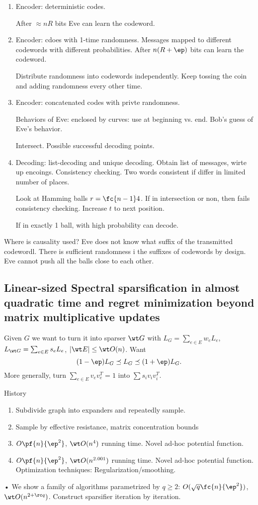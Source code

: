 \begin{enumerate}
\item
Encoder: deterministic codes.

After $\approx nR$ bits Eve can learn the codeword.
\item
Encoder: cdoes with 1-time randomness. Messages mapped to different codewords with different probabilities. After $n(R+\ep)$ bits can learn the codeword. 

Distribute randomness into codewords independently. Keep tossing the coin and adding randomness every other time.
\item
Encoder: concatenated codes with privte randomness. 

Behaviors of Eve: enclosed by curves: use at beginning vs. end. Bob's guess of Eve's behavior.

Intersect. Possible successful decoding points.
\item
Decoding: list-decoding and unique decoding. Obtain list of messages, wirte up encoings. Consistency checking. Two words consistent if differ in limited number of places.

Look at Hamming balls $r=\fc{n-1}4$. If in intersection or non, then fails consistency checking. Increase $t$ to next position.

If in exactly 1 ball, with high probability can decode. %
\end{enumerate}
Where is causality used? Eve does not know what suffix of the transmitted codewordl. There is sufficient randomness i the suffixes of codewords by design. Eve cannot push all the balls close to each other.

\subsection{Linear-sized Spectral sparsification in almost quadratic time and regret minimization beyond matrix multiplicative updates}

Given $G$ we want to turn it into sparser $\wt G$ with $L_G=\sum_{e\in E}w_eL_e$, $L_{\wt G}=\sum_{e\in E} s_eL_e$, $|\wt E|\le \wt O(n)$. Want 
\[
(1-\ep)L_G\preceq L_G\preceq (1+\ep)L_G.
\]
More generally, turn $\sum_{e\in E}v_ev_e^T=1$ into $\sum s_i v_iv_i^T$.

History
\begin{enumerate}
\item
Subdivide graph into expanders and repeatedly sample. 
\item
Sample by effective resistance, matrix concentration bounds
\item
$O\pf{n}{\ep^2}$, $\wt O(n^4)$ running time. Novel ad-hoc potential function.
\item
$O\pf{n}{\ep^2}$, $\wt O(n^{2.001})$ running time. Novel ad-hoc potential function.
Optimization techniques: Regularization/smoothing.
\end{enumerate}•
We show a family of algorithms parametrized by $q\ge 2$: $O(\sqrt q\fc{n}{\ep^2})$, $\wt O(n^{2+\rc q})$. Construct sparsifier iteration by iteration. 

